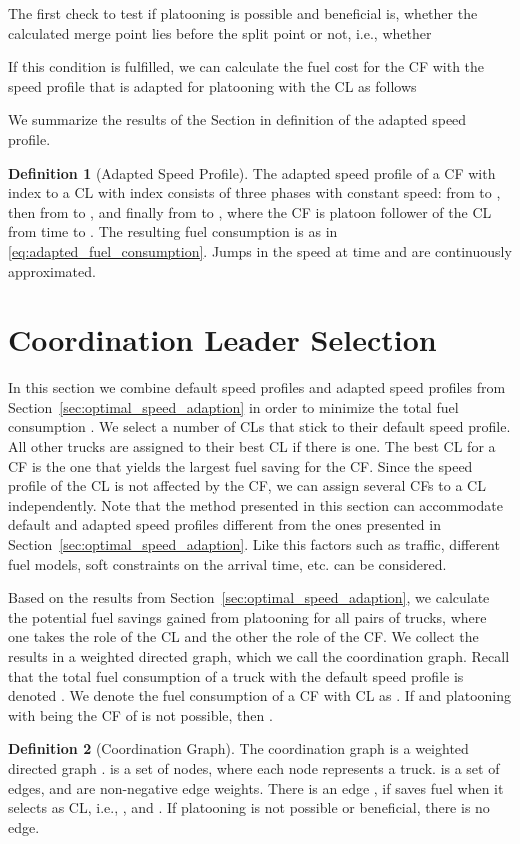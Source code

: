 \documentclass[letterpaper,10pt,conference,twocolumn]{IEEEtran}
\theoremstyle{definition}
\newtheorem{defi}{Definition}
\begin{document}
The first check to test if platooning is possible and beneficial is, whether the calculated merge point lies before the split point or not, i.e., whether

If this condition is fulfilled, we can calculate the fuel cost for the CF with the speed profile that is adapted for platooning with the CL as follows


We summarize the results of the Section in definition of the adapted speed profile.
\begin{defi}[Adapted Speed Profile]
 The adapted speed profile of a CF with index  to a CL with index  consists of three phases with constant speed:  from  to , then  from  to , and finally  from  to , where the CF is platoon follower of the CL from time  to . The resulting fuel consumption is  as in \eqref{eq:adapted_fuel_consumption}. Jumps in the speed at time  and  are continuously approximated.
\end{defi}
 
\section{Coordination Leader Selection}
\label{sec:graph_based_clustering}

In this section we combine default speed profiles and adapted speed profiles from Section~\ref{sec:optimal_speed_adaption} in order to minimize the total fuel consumption . We select a number of CLs that stick to their default speed profile. All other trucks are assigned to their best CL if there is one. The best CL for a CF is the one that yields the largest fuel saving for the CF. Since the speed profile of the CL is not affected by the CF, we can assign several CFs to a CL independently. Note that the method presented in this section can accommodate default and adapted speed profiles different from the ones presented in Section~\ref{sec:optimal_speed_adaption}. Like this factors such as traffic, different fuel models, soft constraints on the arrival time, etc. can be considered.

Based on the results from Section~\ref{sec:optimal_speed_adaption}, we calculate the potential fuel savings gained from platooning for all pairs of trucks, where one takes the role of the CL and the other the role of the CF. We collect the results in a weighted directed graph, which we call the coordination graph. Recall that the total fuel consumption of a truck  with the default speed profile is denoted . We denote the fuel consumption of a CF  with CL  as . If  and  platooning with  being the CF of  is not possible, then .
\begin{defi}[Coordination Graph]
 The coordination graph is a weighted directed graph .  is a set of  nodes, where each node represents a truck.  is a set of edges, and  are non-negative edge weights. There is an edge , if  saves fuel when it selects  as CL, i.e., , and . If platooning is not possible or beneficial, there is no edge. 
\end{defi}
\end{document}
